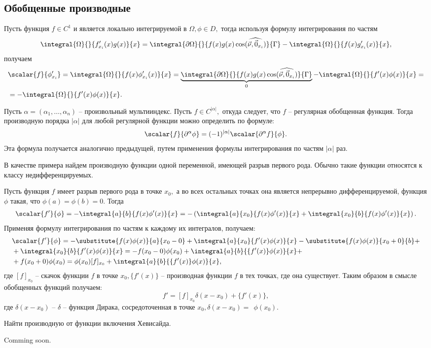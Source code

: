 \subsection{Обобщенные производные}
Пусть функция $f \in C^1$ и является локально интегрируемой в $\Omega, \phi \in D,$ тогда используя формулу интегрирования по частям
$$
 \integral{\Omega}{}{f'_{x_i}(x)g(x)}{x} = \integral{\partial \Omega}{}{f(x)g(x) \cos(\widehat{\vec \nu, \vec 0_{x_i}})}{\Gamma} - \integral{\Omega}{}{f(x)g'_{x_i}(x)}{x},
$$
получаем
\begin{align*}
	&\scalar{f}{\phi'_{x_i}} = \integral{\Omega}{}{f(x)\phi'_{x_i}(x)}{x} = \underbrace{\integral{\partial \Omega}{}{f(x)g(x) \cos(\widehat{\vec \nu, \vec 0_{x_i}})}{\Gamma}}_0 - \integral{\Omega}{}{f'(x)\phi(x)}{x} = \\
 &= - \integral{\Omega}{}{f'(x)\phi(x)}{x}.
\end{align*}

Пусть $\alpha = (\alpha_1, \ldots, \alpha_n)$ -- произвольный мультииндекс.
Пусть $f \in C^{|\alpha|},$ откуда следует, что $f$ -- регулярная обобщенная функция.
Тогда производную порядка $|\alpha|$ для любой регулярной функции можно определить по формуле:
$$
\scalar{f}{\partial^\alpha \phi} = (-1)^{|\alpha|} \scalar{\partial^\alpha f}{\phi}.
$$ 
Эта формула получается аналогично предыдущей, путем применения формулы интегрирования по частям $|\alpha|$ раз.

В качестве примера найдем производную функции одной переменной, имеющей разрыв первого рода. Обычно такие функции относятся к классу недифференцируемых.
\begin{example}
Пусть функция $f$ имеет разрыв первого рода в точке $x_0,$ а во всех остальных точках она является непрерывно дифференцируемой, функция $\phi$ такая, что $\phi(a) = \phi(b) = 0.$
Тогда
\begin{align*}
	\scalar{f'}{\phi} = -\integral{a}{b}{f(x)\phi'(x)}{x} = -\left( \integral{a}{x_0}{f(x)\phi'(x)}{x} + \integral{x_0}{b}{f(x)\phi'(x)}{x} \right).
\end{align*}
Применяя формулу интегрирования по частям к каждому их интегралов, получаем:
\begin{align*}
& \scalar{f'}{\phi} = -\substitute{f(x)\phi(x)}{a}{x_0-0} + \integral{a}{x_0}{f'(x)\phi(x)}{x} - \substitute{f(x)\phi(x)}{x_0+0}{b} + \\
& + \integral{x_0}{b}{f'(x)\phi(x)}{x} = -f(x_0 - 0)\phi(x_0) + \integral{a}{b}{\{f'(x)\}\phi(x)}{x} + \\ &+ f(x_0 +  0)\phi(x_0) = \phi(x_0)[f]_{x_0} + \integral{a}{b}{\{f'(x)\} \phi(x)}{x},	
\end{align*}
где $[f]_{x_0}$ -- скачок функции $f$ в точке $x_0, \{f'(x)\} $ -- производная функции $f$ в тех точках, где она существует.
Таким образом в смысле обобщенных функций получаем:
$$
 f' = [f]_{x_0}\delta(x - x_0) + \{f'(x)\},
$$  
где $\delta(x - x_0)$ -- $\delta$ -- функция Дирака, сосредоточенная в точке $x_0, \delta(x - x_0) =~ ~\phi(x_0).$
\end{example}

\begin{task}
	Найти производную от функции включения Хевисайда.
\end{task}


\begin{solution}
	Comming soon.
\end{solution} 

